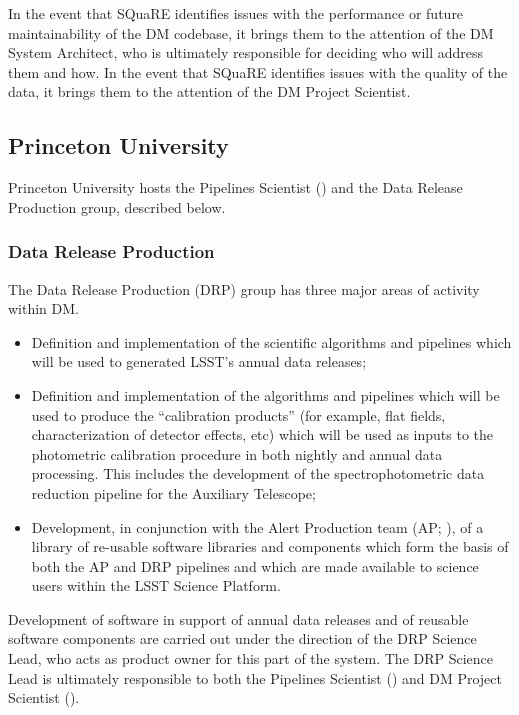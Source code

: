 In the event that SQuaRE identifies issues with the performance or future maintainability of the DM codebase, it brings them to the attention of the DM System Architect, who is ultimately responsible for deciding who will address them and how. In the event that SQuaRE identifies issues with the quality of the data, it brings them to the attention of the DM Project Scientist.

\subsection {Princeton University}\label{sect:princeton}

Princeton University hosts the Pipelines Scientist () and the Data Release Production group, described below.

\subsubsection{Data Release Production \label{sect:drp}}

The Data Release Production (DRP) group has three major areas of activity within DM.

\begin{itemize}

  \item{Definition and implementation of the scientific algorithms and pipelines which will be used to generated LSST's annual data releases;}

  \item{Definition and implementation of the algorithms and pipelines which will be used to produce the ``calibration products'' (for example, flat fields, characterization of detector effects, etc) which will be used as inputs to the photometric calibration procedure in both nightly and annual data processing. This includes the development of the spectrophotometric data reduction pipeline for the Auxiliary Telescope;}

  \item{Development, in conjunction with the Alert Production team (AP; ), of a library of re-usable software libraries and components which form the basis of both the AP and DRP pipelines and which are made available to science users within the LSST Science Platform.}

\end{itemize}

Development of software in support of annual data releases and of reusable software components are carried out under the direction of the DRP Science Lead, who acts as product owner for this part of the system.
The DRP Science Lead is ultimately responsible to both the Pipelines Scientist () and DM Project Scientist ().

